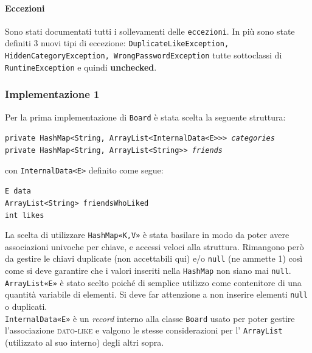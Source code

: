 \documentclass[10pt, a4paper]{article}
\begin{document}
\paragraph{Eccezioni} Sono stati documentati tutti i sollevamenti delle \texttt{eccezioni}. In più sono state definiti 3 nuovi tipi di eccezione: \texttt{DuplicateLikeException, HiddenCategoryException, WrongPasswordException} tutte sottoclassi di \texttt{RuntimeException} e quindi \textbf{unchecked}.
\subsubsection{Implementazione 1}
Per la prima implementazione di \texttt{Board} è stata scelta la seguente struttura: 
\begin{center}
\texttt{private HashMap<String, ArrayList<InternalData<E>>> \emph{categories}\\
	private HashMap<String, ArrayList<String>> \emph{friends}}
\end{center}
con \texttt{InternalData<E>}  definito come segue: 
\begin{center}
\texttt{E data\\
		ArrayList<String> friendsWhoLiked\\
		int likes}
\end{center}
La scelta di utilizzare \texttt{HashMap«K,V»} è stata basilare in modo da poter avere associazioni univoche per chiave, e accessi veloci alla struttura. 
Rimangono però da gestire le chiavi duplicate (non accettabili qui) e/o \texttt{null} (ne ammette 1) così come si deve garantire che i valori inseriti nella \texttt{HashMap} non siano mai \texttt{null}. \\
\texttt{ArrayList«E»} è stato scelto poiché di semplice utilizzo come contenitore di una quantità variabile di elementi. Si deve far attenzione a non inserire elementi \texttt{null} o duplicati.\\
\texttt{InternalData«E»} è un \textit{record} interno alla classe \texttt{Board} usato per poter gestire l'associazione \textsc{dato-like} e valgono le stesse considerazioni per l' \texttt{ArrayList} (utilizzato al suo interno) degli altri sopra.
\end{document}
